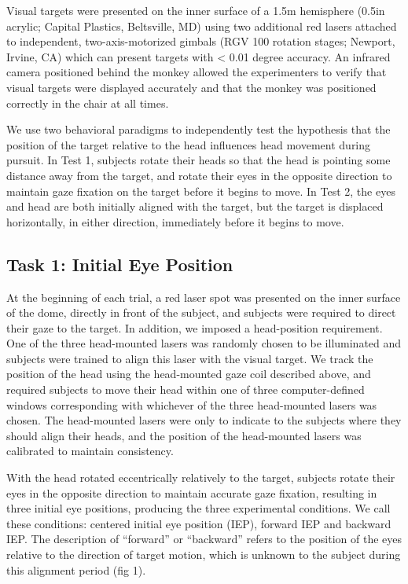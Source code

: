 \documentclass[12pt]{article}
\begin{document}
Visual targets were presented on the inner surface of a 1.5m hemisphere (0.5in acrylic; Capital Plastics, Beltsville, MD) using two additional red lasers attached to independent, two-axis-motorized gimbals (RGV 100 rotation stages; Newport, Irvine, CA) which can present targets with < 0.01 degree accuracy. An infrared camera positioned behind the monkey allowed the experimenters to verify that visual targets were displayed accurately and that the monkey was positioned correctly in the chair at all times. 

We use two behavioral paradigms to independently test the hypothesis that the position of the target relative to the head influences head movement during pursuit. In Test 1, subjects rotate their heads so that the head is pointing some distance away from the target, and rotate their eyes in the opposite direction to maintain gaze fixation on the target before it begins to move. In Test 2, the eyes and head are both initially aligned with the target, but the target is displaced horizontally, in either direction, immediately before it begins to move.

\subsection{Task 1: Initial Eye Position} 
At the beginning of each trial, a red laser spot was presented on the inner surface of the dome, directly in front of the subject, and subjects were required to direct their gaze to the target. In addition, we imposed a head-position requirement. One of the three head-mounted lasers was randomly chosen to be illuminated and subjects were trained to align this laser with the visual target. We track the position of the head using the head-mounted gaze coil described above, and required subjects to move their head within one of three computer-defined windows corresponding with whichever of the three head-mounted lasers was chosen. The head-mounted lasers were only to indicate to the subjects where they should align their heads, and the position of the head-mounted lasers was calibrated to maintain consistency.

With the head rotated eccentrically relatively to the target, subjects rotate their eyes in the opposite direction to maintain accurate gaze fixation, resulting in three initial eye positions, producing the three experimental conditions. We call these conditions: centered initial eye position (IEP), forward IEP and backward IEP. The description of “forward” or “backward” refers to the position of the eyes relative to the direction of target motion, which is unknown to the subject during this alignment period (fig 1).
\end{document}
